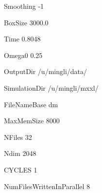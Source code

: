 Smoothing -1

BoxSize 3000.0

Time    0.8048

Omega0  0.25

OutputDir /u/mingli/data/

SimulationDir /u/mingli/mxxl/

FileNameBase dm

MaxMemSize 8000

NFiles 32

Ndim   2048

CYCLES 1

NumFilesWrittenInParallel 8

